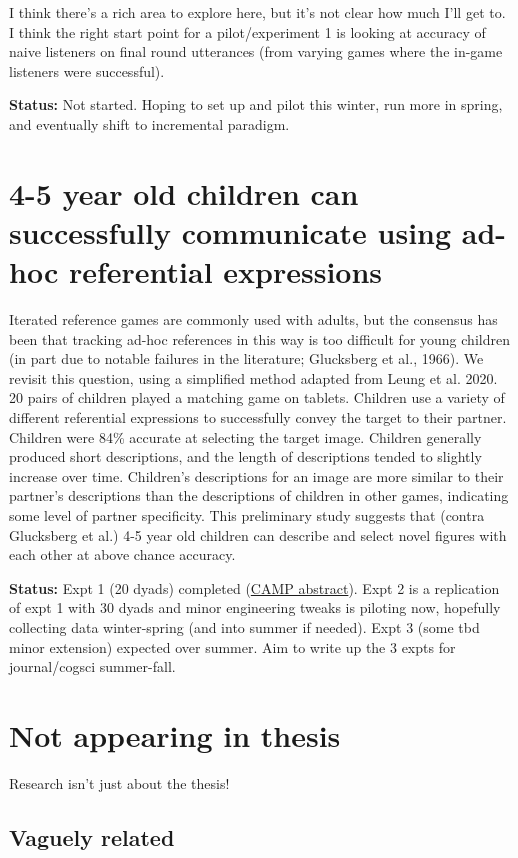 \documentclass[]{article}
\begin{document}
I think there's a rich area to explore here, but it's not clear how much I'll get to. I think the right start point for a pilot/experiment 1 is looking at accuracy of naive listeners on final round utterances (from varying games where the in-game listeners were successful). 

\textbf{Status:} Not started. Hoping to set up and pilot this winter, run more in spring, and eventually shift to incremental paradigm. 

\section{4-5 year old children can successfully communicate using ad-hoc referential expressions}
Iterated reference games are commonly used with adults, but the consensus has been that tracking ad-hoc references in this way is too difficult for young children (in part due to notable failures in the literature; Glucksberg et al., 1966). We revisit this question, using a simplified method adapted from Leung et al. 2020. 20 pairs of children played a matching game on tablets. Children use a variety of different referential expressions to successfully convey the target to their partner. Children were 84\% accurate at selecting the target image. Children generally produced short descriptions, and the length of descriptions tended to slightly increase over time. Children's descriptions for an image are more similar to their partner's descriptions than the descriptions of children in other games, indicating some level of partner specificity. This preliminary study suggests that (contra Glucksberg et al.) 4-5 year old children can describe and select novel figures with each other at above chance accuracy.

\textbf{Status:} Expt 1 (20 dyads) completed (\href{https://github.com/vboyce/kid-tangrams/blob/main/write-ups/CAMP6/abstract.pdf}{CAMP abstract}). Expt 2 is a replication of expt 1 with 30 dyads and minor engineering tweaks is piloting now, hopefully collecting data winter-spring (and into summer if needed). Expt 3 (some tbd minor extension) expected over summer. Aim to write up the 3 expts for journal/cogsci summer-fall. 


\section*{Not appearing in thesis}

Research isn't just about the thesis!

\subsection*{Vaguely related}
\end{document}
